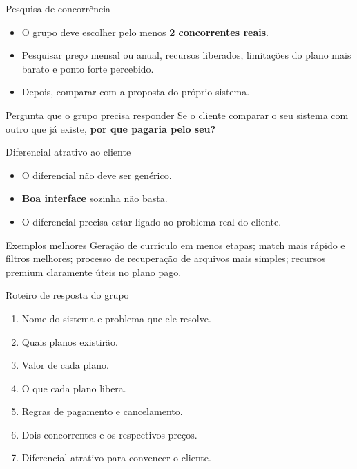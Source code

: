 \documentclass[aspectratio=169]{beamer}
\begin{document}
\begin{frame}{Pesquisa de concorrência}
\begin{itemize}
  \item O grupo deve escolher pelo menos \textbf{2 concorrentes reais}.
  \item Pesquisar preço mensal ou anual, recursos liberados, limitações do plano mais barato e ponto forte percebido.
  \item Depois, comparar com a proposta do próprio sistema.
\end{itemize}

\begin{block}{Pergunta que o grupo precisa responder}
Se o cliente comparar o seu sistema com outro que já existe, \textbf{por que pagaria pelo seu?}
\end{block}
\end{frame}

\begin{frame}{Diferencial atrativo ao cliente}
\begin{itemize}
  \item O diferencial não deve ser genérico.
  \item \textbf{Boa interface} sozinha não basta.
  \item O diferencial precisa estar ligado ao problema real do cliente.
\end{itemize}

\begin{exampleblock}{Exemplos melhores}
Geração de currículo em menos etapas; match mais rápido e filtros melhores; processo de recuperação de arquivos mais simples; recursos premium claramente úteis no plano pago.
\end{exampleblock}
\end{frame}

\begin{frame}{Roteiro de resposta do grupo}
\begin{enumerate}
  \item Nome do sistema e problema que ele resolve.
  \item Quais planos existirão.
  \item Valor de cada plano.
  \item O que cada plano libera.
  \item Regras de pagamento e cancelamento.
  \item Dois concorrentes e os respectivos preços.
  \item Diferencial atrativo para convencer o cliente.
\end{enumerate}
\end{frame}
\end{document}
